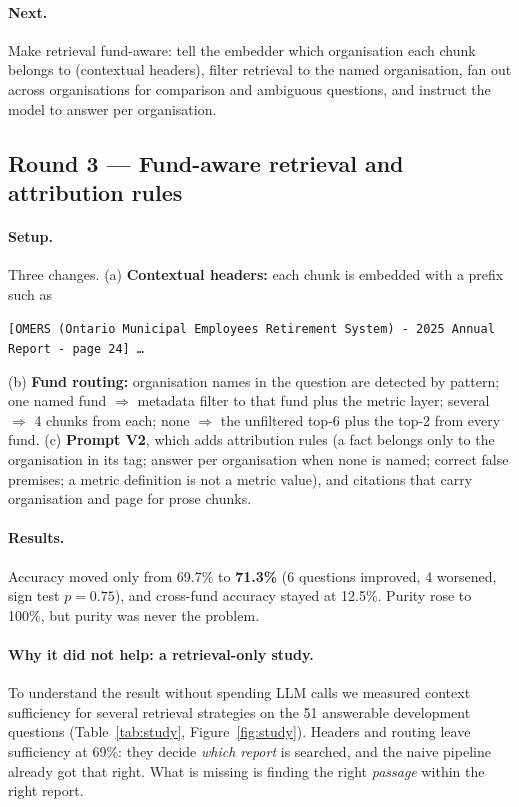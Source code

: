 \documentclass[11pt,a4paper]{article}
\begin{document}
\paragraph{Next.} Make retrieval fund-aware: tell the embedder which organisation each chunk belongs to (contextual
headers), filter retrieval to the named organisation, fan out across organisations for comparison and ambiguous
questions, and instruct the model to answer per organisation.

\subsection{Round 3 --- Fund-aware retrieval and attribution rules}
\label{sec:r3}
\paragraph{Setup.} Three changes. (a) \textbf{Contextual headers:} each chunk is embedded with a prefix such as
\begin{center}\small\texttt{[OMERS (Ontario Municipal Employees Retirement System) - 2025 Annual Report - page 24] \ldots}\end{center}
(b) \textbf{Fund routing:} organisation names in the question are detected by pattern; one named fund $\Rightarrow$
metadata filter to that fund plus the metric layer; several $\Rightarrow$ 4 chunks from each; none $\Rightarrow$
the unfiltered top-6 plus the top-2 from every fund. (c) \textbf{Prompt V2}, which adds attribution rules (a fact
belongs only to the organisation in its tag; answer per organisation when none is named; correct false premises;
a metric definition is not a metric value), and citations that carry organisation and page for prose chunks.

\paragraph{Results.} Accuracy moved only from 69.7\% to \textbf{71.3\%} (6 questions improved, 4 worsened, sign test
$p=0.75$), and cross-fund accuracy stayed at 12.5\%. Purity rose to 100\%, but purity was never the problem.

\paragraph{Why it did not help: a retrieval-only study.} To understand the result without spending LLM calls we
measured context sufficiency for several retrieval strategies on the 51 answerable development questions
(Table~\ref{tab:study}, Figure~\ref{fig:study}). Headers and routing leave sufficiency at 69\%: they decide
\emph{which report} is searched, and the naive pipeline already got that right. What is missing is finding the
right \emph{passage} within the right report.
\end{document}
